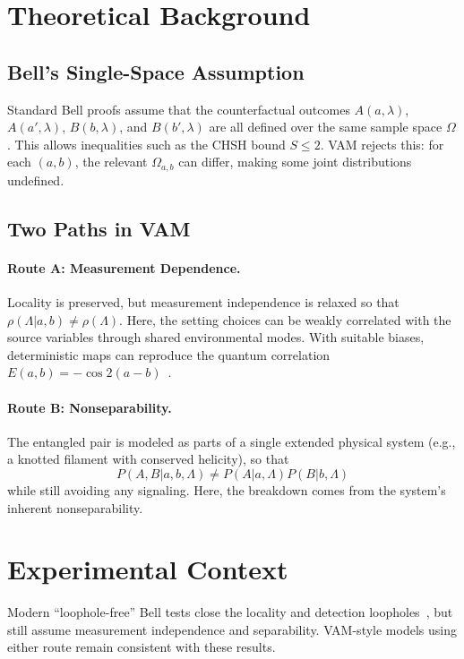 \documentclass[twocolumn,aps,pre,floatfix,nofootinbib]{revtex4-2}
\begin{document}
\section{Theoretical Background}
\subsection{Bell's Single-Space Assumption}
Standard Bell proofs assume that the counterfactual outcomes $A(a,\lambda)$, $A(a',\lambda)$, $B(b,\lambda)$, and $B(b',\lambda)$ are all defined over the same sample space $\Omega$. This allows inequalities such as the CHSH bound $S \leq 2$. VAM rejects this: for each $(a,b)$, the relevant $\Omega_{a,b}$ can differ, making some joint distributions undefined.

\subsection{Two Paths in VAM}
\paragraph{Route A: Measurement Dependence.} Locality is preserved, but measurement independence is relaxed so that $\rho(\Lambda|a,b) \neq \rho(\Lambda)$. Here, the setting choices can be weakly correlated with the source variables through shared environmental modes. With suitable biases, deterministic maps can reproduce the quantum correlation $E(a,b) = -\cos 2(a-b)$~\cite{Hall2010,Brans1988}.

\paragraph{Route B: Nonseparability.} The entangled pair is modeled as parts of a single extended physical system (e.g., a knotted filament with conserved helicity), so that
\[
P(A,B|a,b,\Lambda) \neq P(A|a,\Lambda)P(B|b,\Lambda)
\]
while still avoiding any signaling. Here, the breakdown comes from the system's inherent nonseparability.

\section{Experimental Context}
Modern ``loophole-free'' Bell tests close the locality and detection loopholes~\cite{Hensen2015,Giustina2015,Shalm2015}, but still assume measurement independence and separability. VAM-style models using either route remain consistent with these results.
\end{document}
